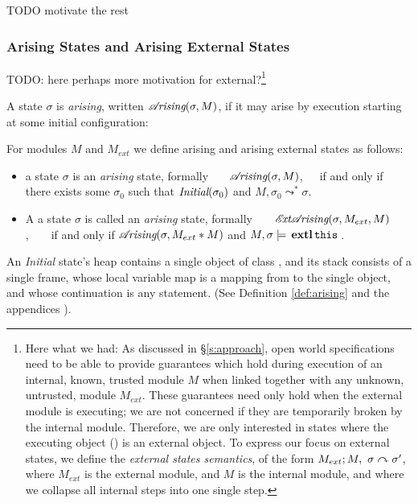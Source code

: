 TODO motivate the rest

\subsubsection{Arising States and {Arising} External States}

{TODO: here perhaps more motivation for external?\footnote{Here what we had: As discussed in \S \ref{s:approach}, 
{open world specifications need to be able to provide}
guarantees which hold
during execution of an internal, 
known, trusted module $M$ when linked together with any
unknown, untrusted, module $M_{ext}$. These guarantees need only hold 
when the external module is executing; we are not concerned if they are
temporarily broken by the internal module. Therefore, we are only interested in states where the
executing object () is an external object. 
To express our focus on external states, we define the  \emph{external states semantics}, of the form 
$M_{ext} ; M,\ \sigma \curvearrowright \sigma'$, where $M_{ext}$ is the external
module, and $M$ is the internal module, and where we
collapse all internal steps into one single step.
}}

{A state $\sigma$ is \emph{arising},}  written $\mathcal{A}\!\textit{rising}(\sigma, M)$, {if it  may arise}  %
by execution
starting at some initial configuration:


\begin{definition}
\label{def:arising}
For modules $M$ and $M_{ext}$ we define arising and arising external states as follows:

\begin{itemize}
\item
 a state $\sigma$ is 
{ an \emph{arising} state, formally \ \ \  $\mathcal{A}\!\textit{rising}(\sigma, M)$,\ \ \ 
if and only if there exists some $\sigma_0$ such that $\textit{Initial}(\sigma_0)$ and
$M, {\sigma_0} \leadsto^* {\sigma}$.}
\item
{A a state $\sigma$ is 
called an \emph{arising} state, formally\ \ \ \  ${\mathcal{E}\!\textit{xt}\mathcal{A}\!\textit{rising}(\sigma, M_{ext}, M)}$,\ \ \ \
if and only if $\mathcal{A}\!\textit{rising}(\sigma, M_{ext}*M)$ and $M, \sigma \models \external{}$.}
\end{itemize}
\end{definition}


An \emph{Initial} state's heap contains a single object of class , and
its  stack   consists of a single frame, whose local variable map is a
mapping from \prg{this} to the single object, and whose continuation is  any statement.
(See Definition %
\ref{def:arising} and the 
{appendices %
\cite{necessityFull}).}



